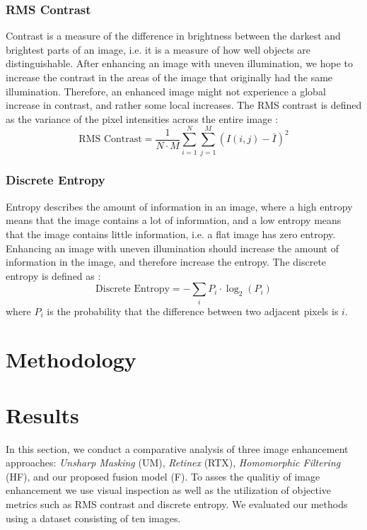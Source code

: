 \documentclass[sigconf]{acmart}
\begin{document}
\subsubsection{RMS Contrast}\label{sec:rms-contrast}
Contrast is a measure of the difference in brightness between the darkest and brightest parts of an image, i.e. it is a measure of how well objects are distinguishable. After enhancing an image with uneven illumination, we hope to increase the contrast in the areas of the image that originally had the same illumination. Therefore, an enhanced image might not experience a global increase in contrast, and rather some local increases. The RMS contrast is defined as the variance of the pixel intensities across the entire image \cite{dey2019uneven}:
\begin{equation}
	\text{RMS Contrast} = \frac{1}{N \cdot M} \sum_{i=1}^{N} \sum_{j=1}^{M} (I(i,j) - \bar{I})^2
\end{equation}

\subsubsection{Discrete Entropy}\label{sec:discrete-entropy}
Entropy describes the amount of information in an image, where a high entropy means that the image contains a lot of information, and a low entropy means that the image contains little information, i.e. a flat image has zero entropy. Enhancing an image with uneven illumination should increase the amount of information in the image, and therefore increase the entropy. The discrete entropy is defined as \cite{dey2019uneven,ye2007discrete}:
\begin{equation}
	\text{Discrete Entropy} = - \sum_{i} P_i \cdot \log_2(P_i)
\end{equation}
where $P_i$ is the probability that the difference between two adjacent pixels is $i$.


\section{Methodology}\label{sec:method}


\section{Results}\label{sec:results}
In this section, we conduct a comparative analysis of three image enhancement approaches: \textit{Unsharp Masking} (UM), \textit{Retinex} (RTX), \textit{Homomorphic Filtering} (HF), and our proposed fusion model (F). To asses the qualitiy of image enhancement we use visual inspection as well as the utilization of objective metrics such as RMS contrast and discrete entropy. We evaluated our methods using a dataset consisting of ten images.
\end{document}
